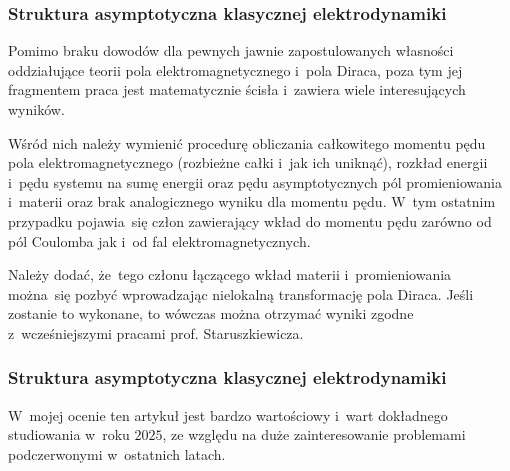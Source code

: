 \documentclass[10pt,t]{beamer}
\begin{document}
\begin{frame}
  \frametitle{Struktura asymptotyczna klasycznej elektrodynamiki}


  Pomimo braku dowodów dla pewnych jawnie zapostulowanych własności
  oddziałujące teorii pola elektromagnetycznego i~pola Diraca, poza tym jej
  fragmentem praca jest matematycznie ścisła i~zawiera wiele interesujących
  wyników.

  Wśród nich należy wymienić procedurę obliczania całkowitego momentu pędu
  pola elektromagnetycznego (rozbieżne całki i~jak ich uniknąć), rozkład
  energii i~pędu systemu na sumę energii oraz pędu asymptotycznych pól
  promieniowania i~materii oraz brak analogicznego wyniku dla momentu pędu.
  W~tym ostatnim przypadku pojawia~się człon zawierający wkład do momentu
  pędu zarówno od pól Coulomba jak i~od fal elektromagnetycznych.

  Należy dodać, że~tego członu łączącego wkład materii i~promieniowania
  można~się pozbyć wprowadzając nielokalną transformację pola Diraca. Jeśli
  zostanie to wykonane, to wówczas można otrzymać wyniki zgodne
  z~wcześniejszymi pracami prof. Staruszkiewicza.


\end{frame}





\begin{frame}
  \frametitle{Struktura asymptotyczna klasycznej elektrodynamiki}





  W~mojej ocenie ten artykuł jest bardzo wartościowy i~wart dokładnego
  studiowania w~roku $2025$, ze względu na duże zainteresowanie problemami
  podczerwonymi w~ostatnich latach.

\end{frame}
\end{document}
